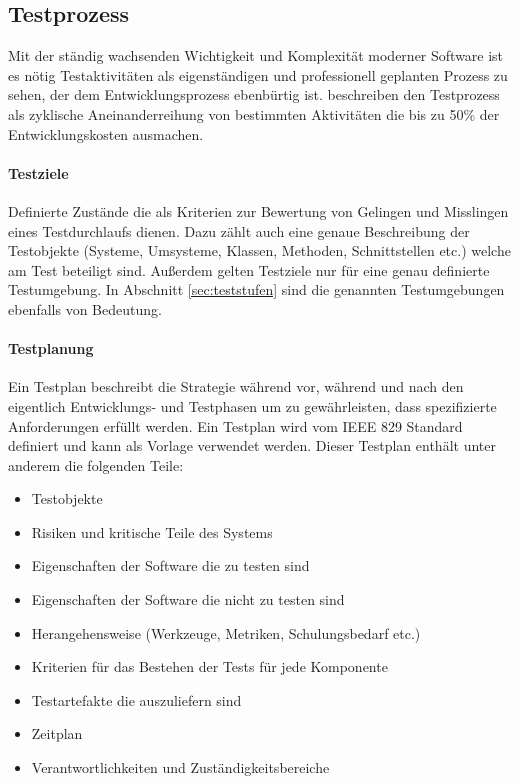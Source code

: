 \subsection{Testprozess}
Mit der ständig wachsenden Wichtigkeit und Komplexität moderner Software ist es nötig Testaktivitäten als eigenständigen und professionell geplanten Prozess zu sehen, der dem Entwicklungsprozess ebenbürtig ist\cite{grechenig_softwaretechnik:_2010}. \citeauthor{grechenig_softwaretechnik:_2010} beschreiben den Testprozess als zyklische Aneinanderreihung von bestimmten Aktivitäten die bis zu 50\% der Entwicklungskosten ausmachen.

\paragraph{Testziele} Definierte Zustände die als Kriterien zur Bewertung von Gelingen und Misslingen eines Testdurchlaufs dienen. Dazu zählt auch eine genaue Beschreibung der Testobjekte (Systeme, Umsysteme, Klassen, Methoden, Schnittstellen etc.) welche am Test beteiligt sind. Außerdem gelten Testziele nur für eine genau definierte Testumgebung. In Abschnitt \ref{sec:teststufen}  sind die genannten Testumgebungen ebenfalls von Bedeutung.

\paragraph{Testplanung} Ein Testplan beschreibt die Strategie während vor, während und nach den eigentlich Entwicklungs- und Testphasen um zu gewährleisten, dass spezifizierte Anforderungen erfüllt werden. Ein Testplan wird vom IEEE 829\cite{_ieee_2008} Standard definiert und kann als Vorlage verwendet werden. Dieser Testplan enthält unter anderem die folgenden Teile:

\begin{itemize}
\item Testobjekte
\item Risiken und kritische Teile des Systems
\item Eigenschaften der Software die zu testen sind
\item Eigenschaften der Software die nicht zu testen sind
\item Herangehensweise (Werkzeuge, Metriken, Schulungsbedarf etc.)
\item Kriterien für das Bestehen der Tests für jede Komponente
\item Testartefakte die auszuliefern sind
\item Zeitplan
\item Verantwortlichkeiten und Zuständigkeitsbereiche
\end{itemize}

